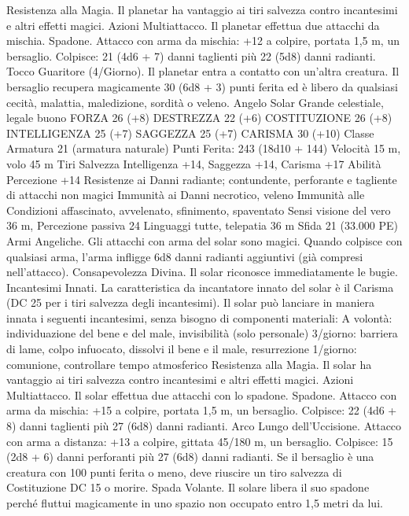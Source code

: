 \begin{multicols}{2}
Resistenza alla Magia. Il planetar ha vantaggio ai tiri salvezza
contro incantesimi e altri effetti magici.
Azioni
Multiattacco. Il planetar effettua due attacchi da mischia.
Spadone. Attacco con arma da mischia: +12 a colpire, portata
1,5 m, un bersaglio.
Colpisce: 21 (4d6 + 7) danni taglienti più 22 (5d8) danni radianti.
Tocco Guaritore (4/Giorno). Il planetar entra a contatto con
un’altra creatura. Il bersaglio recupera magicamente 30 (6d8 + 3)
punti ferita ed è libero da qualsiasi cecità, malattia, maledizione,
sordità o veleno.
Angelo Solar
Grande celestiale, legale buono
FORZA 26 (+8)
DESTREZZA 22 (+6)
COSTITUZIONE 26 (+8)
INTELLIGENZA 25 (+7)
SAGGEZZA 25 (+7)
CARISMA 30 (+10)
Classe Armatura 21 (armatura naturale)
\hspace*{0pt}\hfill{Punti Ferita}: 243 (18d10 + 144)
Velocità 15 m, volo 45 m
Tiri Salvezza Intelligenza +14, Saggezza +14, Carisma +17
Abilità Percezione +14
Resistenze ai Danni radiante; contundente, perforante e tagliente
di attacchi non magici
Immunità ai Danni necrotico, veleno
Immunità alle Condizioni affascinato, avvelenato, sfinimento,
spaventato
Sensi visione del vero 36 m, Percezione passiva 24
Linguaggi tutte, telepatia 36 m
Sfida 21 (33.000 PE)
Armi Angeliche. Gli attacchi con arma del solar sono magici.
Quando colpisce con qualsiasi arma, l’arma infligge 6d8 danni
radianti aggiuntivi (già compresi nell’attacco).
Consapevolezza Divina. Il solar riconosce immediatamente le
bugie.
Incantesimi Innati. La caratteristica da incantatore innato del
solar è il Carisma (DC 25 per i tiri salvezza degli incantesimi). Il
solar può lanciare in maniera innata i seguenti incantesimi, senza
bisogno di componenti materiali:
A volontà: individuazione del bene e del male, invisibilità (solo
personale)
3/giorno: barriera di lame, colpo infuocato, dissolvi il bene e il
male, resurrezione
1/giorno: comunione, controllare tempo atmosferico
Resistenza alla Magia. Il solar ha vantaggio ai tiri salvezza
contro incantesimi e altri effetti magici.
Azioni
Multiattacco. Il solar effettua due attacchi con lo spadone.
Spadone. Attacco con arma da mischia: +15 a colpire, portata
1,5 m, un bersaglio.
Colpisce: 22 (4d6 + 8) danni taglienti più 27 (6d8) danni radianti.
Arco Lungo dell’Uccisione. Attacco con arma a distanza: +13 a
colpire, gittata 45/180 m, un bersaglio.
Colpisce: 15 (2d8 + 6) danni perforanti più 27 (6d8) danni radianti.
Se il bersaglio è una creatura con 100 punti ferita o meno, deve
riuscire un tiro salvezza di Costituzione DC 15 o morire.
Spada Volante. Il solare libera il suo spadone perché fluttui
magicamente in uno spazio non occupato entro 1,5 metri da lui.

\end{multicols}
